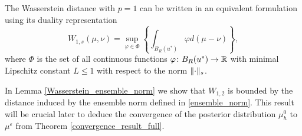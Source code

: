 \begin{remark}
The Wasserstein distance with $p = 1$ can be written in an equivalent formulation using its duality representation
\begin{equation}
\label{Wasserstein_dual}
W_{1,s}(\mu, \nu) = \sup_{\varphi \in \Phi} \left \{ \int_{B_R(u^*)} \varphi d(\mu - \nu) \right \},
\end{equation}
where $\Phi$ is the set of all continuous functions $\varphi \colon B_R(u^*) \to \mathbb{R}$ with minimal Lipschitz constant $L \le 1$ with respect to the norm $\lVert\cdot\rVert_s$.
\end{remark}

In Lemma \ref{Wasserstein_ensemble_norm} we show that $W_{1,2}$ is bounded by the distance induced by the ensemble norm defined in \ref{ensemble_norm}. This result will be crucial later to deduce the convergence of the posterior distribution $\mu_h^0$ to $\mu^{\varepsilon}$ from Theorem \ref{convergence_result_full}.

